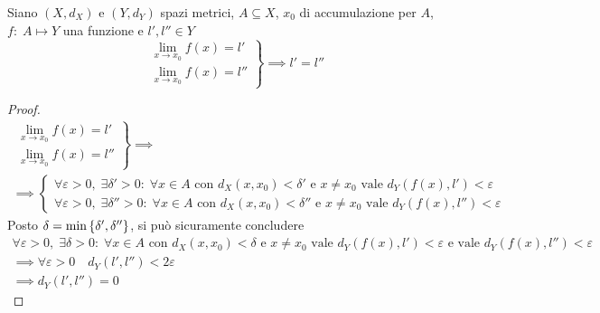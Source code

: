 \begin{theorem}
	Siano $(X,d_X)$ e $(Y,d_Y)$ spazi metrici, $A \subseteq X$, $x_0$ di accumulazione per $A$, $f:\; A \mapsto Y$ una funzione e $l', l'' \in Y$
	\begin{equation*}
		\left.
		\begin{array}{c}
			\lim\limits_{x \to x_0} f(x) = l'\\
			\lim\limits_{x \to x_0} f(x) = l''
		\end{array}
		\right\}
		\implies l' = l''
	\end{equation*}
	\begin{proof}
		\begin{equation*}
			\begin{gathered}
				\left.
				\begin{array}{c}
					\lim\limits_{x \to x_0} f(x) = l'\\
					\lim\limits_{x \to x_0} f(x) = l''
				\end{array}
				\right\} \implies\\
				\implies
				\begin{cases}
					\forall \varepsilon > 0,\; \exists \delta' > 0:\; \forall x \in A \text{ con } d_X(x,x_0) < \delta' \text{ e } x \neq x_0 \text{ vale } d_Y(f(x),l')<\varepsilon\\
					\forall \varepsilon > 0,\; \exists \delta'' > 0:\; \forall x \in A \text{ con } d_X(x,x_0) < \delta'' \text{ e } x \neq x_0 \text{ vale } d_Y(f(x),l'')<\varepsilon
				\end{cases}
			\end{gathered}
		\end{equation*}
		Posto $\delta = \min \left\{\delta', \delta''\right\}$, si può sicuramente concludere
		\begin{equation*}
			\begin{gathered}
				\forall \varepsilon > 0,\; \exists \delta > 0:\; \forall x \in A \text{ con } d_X(x,x_0) < \delta \text{ e } x \neq x_0 \text{ vale } d_Y(f(x),l')<\varepsilon \text{ e vale } d_Y(f(x),l'') <\varepsilon\\
				\implies \forall \varepsilon > 0 \quad d_Y(l', l'') < 2 \varepsilon\\
				\implies d_Y(l', l'') = 0
			\end{gathered}
		\end{equation*}
	\end{proof}
\end{theorem}

